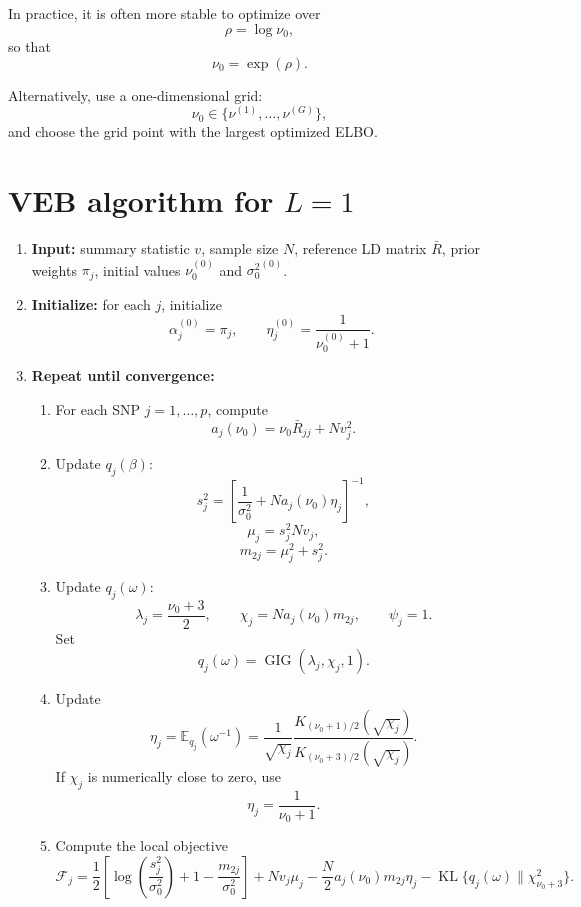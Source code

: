 \documentclass[11pt]{article}
\newcommand{\Rbar}{\bar R}
\newcommand{\nuo}{\nu_0}
\newcommand{\sigb}{\sigma_0^2}
\newcommand{\E}{\mathbb E}
\newcommand{\KL}{\operatorname{KL}}
\newcommand{\GIG}{\operatorname{GIG}}
\newcommand{\chisq}{\chi^2}
\begin{document}
In practice, it is often more stable to optimize over
\[
\rho=\log\nuo,
\]
so that
\[
\nuo=\exp(\rho).
\]

Alternatively, use a one-dimensional grid:
\[
\nuo\in\{\nu^{(1)},\dots,\nu^{(G)}\},
\]
and choose the grid point with the largest optimized ELBO.

\section{VEB algorithm for \(L=1\)}

\begin{enumerate}[leftmargin=2em]

\item \textbf{Input:}
summary statistic \(v\), sample size \(N\), reference LD matrix \(\Rbar\), prior weights \(\pi_j\), initial values \(\nuo^{(0)}\) and \({\sigb}^{(0)}\).

\item \textbf{Initialize:}
for each \(j\), initialize
\[
\alpha_j^{(0)}=\pi_j,
\qquad
\eta_j^{(0)}=\frac{1}{\nuo^{(0)}+1}.
\]

\item \textbf{Repeat until convergence:}

\begin{enumerate}[leftmargin=2em]

\item For each SNP \(j=1,\dots,p\), compute
\[
a_j(\nuo)=\nuo\Rbar_{jj}+Nv_j^2.
\]

\item Update \(q_j(\beta)\):
\[
s_j^2
=
\left[
\frac{1}{\sigb}
+
N a_j(\nuo)\eta_j
\right]^{-1},
\]
\[
\mu_j=s_j^2Nv_j,
\]
\[
m_{2j}=\mu_j^2+s_j^2.
\]

\item Update \(q_j(\omega)\):
\[
\lambda_j=\frac{\nuo+3}{2},
\qquad
\chi_j=N a_j(\nuo)m_{2j},
\qquad
\psi_j=1.
\]
Set
\[
q_j(\omega)=\GIG(\lambda_j,\chi_j,1).
\]

\item Update
\[
\eta_j
=
\E_{q_j}(\omega^{-1})
=
\frac{1}{\sqrt{\chi_j}}
\frac{
K_{(\nuo+1)/2}(\sqrt{\chi_j})
}{
K_{(\nuo+3)/2}(\sqrt{\chi_j})
}.
\]
If \(\chi_j\) is numerically close to zero, use
\[
\eta_j=\frac{1}{\nuo+1}.
\]

\item Compute the local objective
\[
\mathcal F_j
=
\frac12
\left[
\log\left(\frac{s_j^2}{\sigb}\right)
+
1
-
\frac{m_{2j}}{\sigb}
\right]
+
Nv_j\mu_j
-
\frac N2a_j(\nuo)m_{2j}\eta_j
-
\KL\{q_j(\omega)\|\chisq_{\nuo+3}\}.
\]


\end{enumerate}
\end{enumerate}
\end{document}
